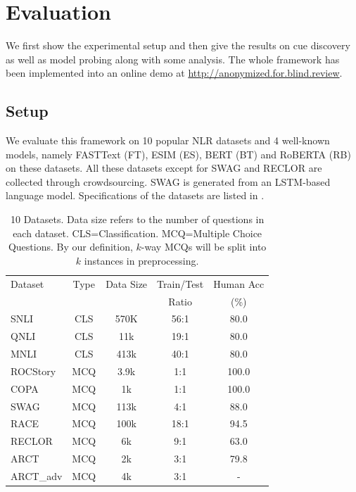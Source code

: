 \section{Evaluation}
\label{sec:eval}
We first show the experimental setup and then give the results
on cue discovery as well as model probing along with some analysis.
The whole framework has been implemented into an online demo at
\url{http://anonymized.for.blind.review}.

\subsection{Setup} 
We evaluate this framework on 10 popular NLR datasets and
4 well-known models, namely FASTText (FT), ESIM (ES), BERT (BT) and RoBERTA (RB)
on these datasets. All these datasets except for SWAG and RECLOR are collected
through crowdsourcing. SWAG is generated from an LSTM-based language model.
Specifications of the datasets are listed in .

\begin{table}[th]
\scriptsize
\centering
\begin{tabular}{lcccc}\hline
Dataset & Type & Data Size & Train/Test & Human Acc\\ 
 	&	&	& Ratio	& (\%) \\ \hline
SNLI     &CLS   &  570K     & 56:1               &80.0\\
QNLI     &CLS    & 11k         &  19:1           &80.0\\
MNLI     &CLS     & 413k       &  40:1             &80.0\\
ROCStory & MCQ & 3.9k         & 1:1            &100.0  \\
COPA     &MCQ    & 1k           &  1:1         & 100.0     \\
SWAG     &MCQ   & 113k       &  4:1             & 88.0\\
RACE     & MCQ   & 100k      &  18:1              &94.5\\
RECLOR   &MCQ    &  6k          &  9:1           &63.0\\
ARCT     &MCQ    & 2k         & 3:1                &79.8\\
ARCT\_adv& MCQ & 4k         & 3:1                 & -\\
\hline
\end{tabular}
\caption{10 Datasets. Data size refers to the number of questions
in each dataset. CLS=Classification. MCQ=Multiple Choice Questions. 
By our definition, $k$-way MCQs will be split into $k$ instances 
in preprocessing.}\label{tab:datasets} 
\end{table}

